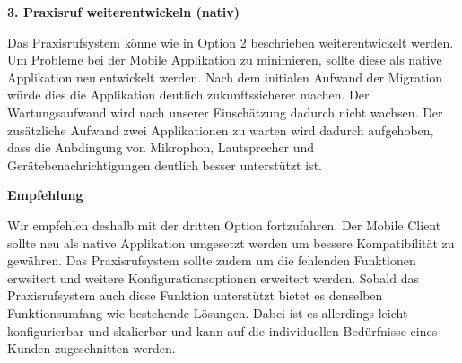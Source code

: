 \textbf{3. Praxisruf weiterentwickeln (nativ) }

Das Praxisrufsystem könne wie in Option 2 beschrieben weiterentwickelt werden.
Um Probleme bei der Mobile Applikation zu minimieren, sollte diese als native Applikation neu entwickelt werden.
Nach dem initialen Aufwand der Migration würde dies die Applikation deutlich zukunftssicherer machen.
Der Wartungsaufwand wird nach unserer Einschätzung dadurch nicht wachsen.
Der zusätzliche Aufwand zwei Applikationen zu warten wird dadurch aufgehoben, dass die Anbdingung von Mikrophon, Lautsprecher
und Gerätebenachrichtigungen deutlich besser unterstützt ist.

\textbf{Empfehlung}

Wir empfehlen deshalb mit der dritten Option fortzufahren.
Der Mobile Client sollte neu als native Applikation umgesetzt werden um bessere Kompatibilität zu gewähren.
Das Praxisrufsystem sollte zudem um die fehlenden Funktionen erweitert und weitere Konfigurationsoptionen erweitert werden.
Sobald das Praxisrufsystem auch diese Funktion unterstützt bietet es denselben Funktionsumfang wie bestehende Lösungen.
Dabei ist es allerdings leicht konfigurierbar und skalierbar und kann auf die individuellen Bedürfnisse eines Kunden zugeschnitten werden.

\clearpage
